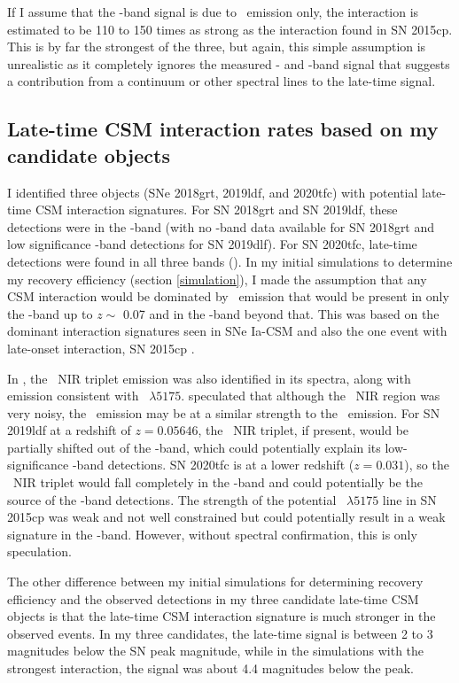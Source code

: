 \documentclass[a4paper,oneside,12pt, class=Latex/Classes/PhDthesisPSnPDF, crop=false]{standalone}
\begin{document}
If I assume that the \ztfr-band signal is due to \Halpha~emission only, the interaction is estimated to be 110 to 150 times as strong as the interaction found in SN 2015cp. This is by far the strongest of the three, but again, this simple assumption is unrealistic as it completely ignores the measured \ztfg- and \ztfi-band signal that suggests a contribution from a continuum or other spectral lines to the late-time signal.


\subsection{Late-time CSM interaction rates based on my candidate objects}
\label{rates_csm}
I identified three objects (SNe 2018grt, 2019ldf, and 2020tfc) with potential late-time CSM interaction signatures. For SN 2018grt and SN 2019ldf, these detections were in the \ztfr-band (with no \ztfi-band data available for SN 2018grt and low significance \ztfi-band detections for SN 2019dlf). For SN 2020tfc, late-time detections were found in all three bands (\ztfg\ztfr\ztfi). In my initial simulations to determine my recovery efficiency (section \ref{simulation}), I made the assumption that any CSM interaction would be dominated by \Halpha~emission that would be present in only the \ztfr-band up to $z \sim$ 0.07 and in the \ztfi-band beyond that. This was based on the dominant interaction signatures seen in SNe Ia-CSM and also the one event with late-onset interaction, SN 2015cp \citep{2015cp}.

In \citet{2015cp}, the \CaII\ NIR triplet emission was also identified in its spectra, along with emission consistent with \MgI~$\lambda5175$. \cite{2015cp_radio} speculated that although the \CaII\ NIR region was very noisy, the \CaII\ emission may be at a similar strength to the \Halpha~emission. For SN 2019ldf at a redshift of $z=0.05646$, the \CaII\ NIR triplet, if present, would be partially shifted out of the \ztfi-band, which could potentially explain its low-significance \ztfi-band detections. SN 2020tfc is at a lower redshift ($z=0.031$), so the \CaII\ NIR triplet would fall completely in the \ztfi-band and could potentially be the source of the \ztfi-band detections. The strength of the potential \MgI~$\lambda5175$ line in SN 2015cp was weak and not well constrained \citep{2015cp} but could potentially result in a weak signature in the \ztfg-band. However, without spectral confirmation, this is only speculation.

The other difference between my initial simulations for determining recovery efficiency and the observed detections in my three candidate late-time CSM objects is that the late-time CSM interaction signature is much stronger in the observed events. In my three candidates, the late-time signal is between 2 to 3 magnitudes below the SN peak magnitude, while in the simulations with the strongest interaction, the signal was about 4.4 magnitudes below the peak.
\end{document}
